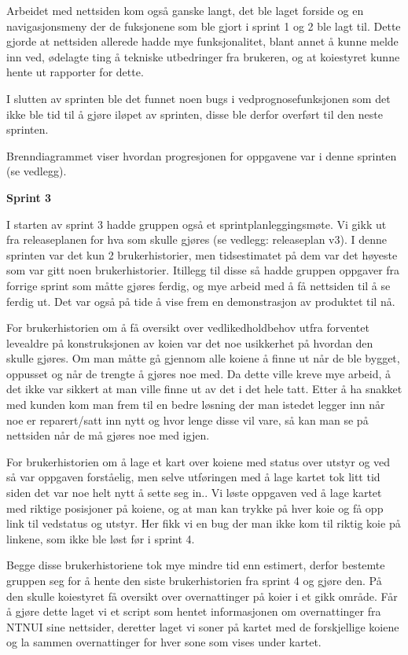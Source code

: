\documentclass[12pt,a4paper,norsk]{article}
\begin{document}
Arbeidet med nettsiden kom også ganske langt, det ble laget forside og en navigasjonsmeny der de fuksjonene som ble gjort i sprint 1 og 2 ble lagt til. Dette gjorde at nettsiden allerede hadde mye funksjonalitet, blant annet å kunne melde inn ved, ødelagte ting å tekniske utbedringer fra brukeren, og at koiestyret kunne hente ut rapporter for dette. 

I slutten av sprinten ble det funnet noen bugs i vedprognosefunksjonen som det ikke ble tid til å gjøre iløpet av sprinten, disse ble derfor overført til den neste sprinten.

Brenndiagrammet viser hvordan progresjonen for oppgavene var i denne sprinten (se vedlegg).

\bigskip \noindent \textbf{Sprint 3}
\par I starten av sprint 3 hadde gruppen også et sprintplanleggingsmøte. Vi gikk ut fra releaseplanen for hva som skulle gjøres (se vedlegg: releaseplan v3). I denne sprinten var det kun 2 brukerhistorier, men tidsestimatet på dem var det høyeste som var gitt noen brukerhistorier. Itillegg til disse så hadde gruppen oppgaver fra forrige sprint som måtte gjøres ferdig, og mye arbeid med å få nettsiden til å se ferdig ut. Det var også på tide å vise frem en demonstrasjon av produktet til nå. 

For brukerhistorien om å få oversikt over vedlikedholdbehov utfra forventet levealdre på konstruksjonen av koien var det noe usikkerhet på hvordan den skulle gjøres. Om man måtte gå gjennom alle koiene å finne ut når de ble bygget, oppusset og når de trengte å gjøres noe med. Da dette ville kreve mye arbeid, å det ikke var sikkert at man ville finne ut av det i det hele tatt. Etter å ha snakket med kunden kom man frem til en bedre løsning der man istedet legger inn når noe er reparert/satt inn nytt og hvor lenge disse vil vare, så kan man se på nettsiden når de må gjøres noe med igjen. 

For brukerhistorien om å lage et kart over koiene med status over utstyr og ved så var oppgaven forståelig, men selve utføringen med å lage kartet tok litt tid siden det var noe helt nytt å sette seg in.. Vi løste oppgaven ved å lage kartet med riktige posisjoner på koiene, og at man kan trykke på hver koie og få opp link til vedstatus og utstyr. Her fikk vi en bug der man ikke kom til riktig koie på linkene, som ikke ble løst før i sprint 4.   

Begge disse brukerhistoriene tok mye mindre tid enn estimert, derfor bestemte gruppen seg for å hente den siste brukerhistorien fra sprint 4 og gjøre den. På den skulle koiestyret få oversikt over overnattinger på koier i et gikk område. Får å gjøre dette laget vi et script som hentet informasjonen om overnattinger fra NTNUI sine nettsider, deretter laget vi soner på kartet med de forskjellige koiene og la sammen overnattinger for hver sone som vises under kartet. 
\end{document}
